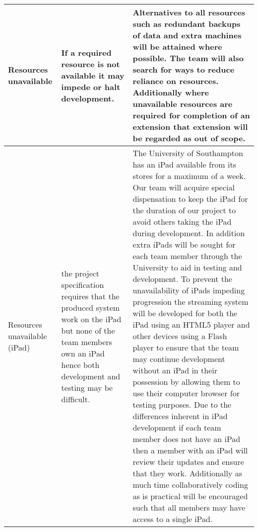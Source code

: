 \begin{center}
\begin{landscape}
\begin{longtable}{|p{3cm}|p{7cm}|p{12cm}|}
        Resources unavailable                            & If a required resource is not available it may impede or halt development.                                                                                                                                                                                                                                                                                                   & Alternatives to all resources such as redundant backups of data and extra machines will be attained where possible. The team will also search for ways to reduce reliance on resources. Additionally where unavailable resources are required for completion of an extension that extension will be regarded as out of scope.                                                                                                                                                                                                                                                                                                                                                                                                                                                                                                                                                                                                                                                                                                            \\ \hline
        Resources unavailable (iPad)                     & the project specification requires that the produced system work on the iPad but none of the team members own an iPad hence both development and testing may be difficult.                                                                                                                                                                                                   & The University of Southampton has an iPad available from its stores for a maximum of a week. Our team will acquire special dispensation to keep the iPad for the duration of our project to avoid others taking the iPad during development. In addition extra iPads will be sought for each team member through the University to aid in testing and development. To prevent the unavailability of iPads impeding progression the streaming system will be developed for both the iPad using an HTML5 player and other devices using a Flash player to ensure that the team may continue development without an iPad in their possession by allowing them to use their computer browser for testing purposes. Due to the differences inherent in iPad development if each team member does not have an iPad then a member with an iPad will review their updates and ensure that they work. Additionally as much time collaboratively coding as is practical will be encouraged such that all members may have access to a single iPad. \\ \hline

\end{longtable}
\end{landscape}
\end{center}
